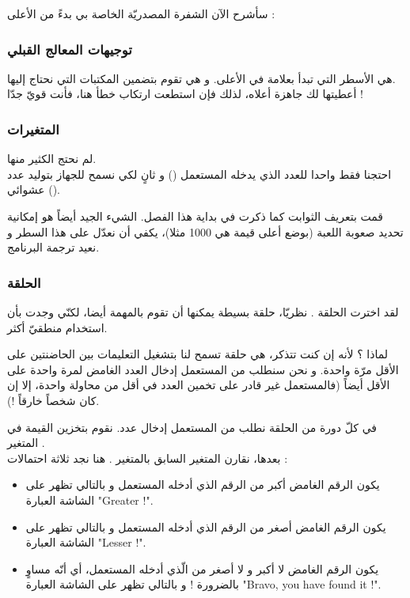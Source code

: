 سأشرح الآن الشفرة المصدريّة الخاصة بي بدءً من الأعلى :

\subsubsection{توجيهات المعالج القبلي}

هي الأسطر التي تبدأ بعلامة 
\InlineCode{\#}
في الأعلى. و هي تقوم بتضمين المكتبات التي نحتاج إليها.\\
أعطيتها لك جاهزة أعلاه، لذلك فإن استطعت ارتكاب خطأ هنا، فأنت قويّ جدّا !

\subsubsection{المتغيرات}

لم نحتج الكثير منها.\\
احتجنا فقط واحدا للعدد الذي يدخله المستعمل
() 
و ثانٍ لكي نسمح للجهاز بتوليد عدد عشوائي 
().

قمت بتعريف الثوابت كما ذكرت في بداية هذا الفصل. الشيء الجيد أيضاً هو إمكانية تحديد صعوبة اللعبة (بوضع أعلى قيمة هي 1000 مثلا)، يكفي أن نعدّل على هذا السطر و نعيد ترجمة البرنامج.

\subsubsection{الحلقة}

لقد اخترت الحلقة 
.
نظريّا، حلقة 
بسيطة يمكنها أن تقوم بالمهمة أيضا، لكنّي وجدت بأن استخدام 
منطقيّ أكثر. 

لماذا ؟  لأنه إن كنت تتذكر، 
هي حلقة تسمح لنا بتشغيل التعليمات بين الحاضنتين على الأقل مرّة واحدة. و نحن سنطلب من المستعمل إدخال العدد الغامض لمرة واحدة على الأقل أيضاً (فالمستعمل غير قادر على تخمين العدد في أقل من محاولة واحدة، إلا إن كان شخصاً خارقاً !).

في كلّ دورة من الحلقة نطلب من المستعمل إدخال عدد. نقوم بتخزين القيمة في المتغير 
.\\
بعدها، نقارن المتغير السابق بالمتغير 
.
هنا نجد ثلاثة احتمالات :

\begin{itemize}
	\item يكون الرقم الغامض أكبر من الرقم الذي أدخله المستعمل و بالتالي تظهر على الشاشة العبارة
	"\textenglish{Greater !}".
	\item يكون الرقم الغامض أصغر من الرقم الذي أدخله المستعمل و بالتالي تظهر على الشاشة العبارة
	"\textenglish{Lesser !}".
	\item يكون الرقم الغامض لا أكبر و لا أصغر من الّذي أدخله المستعمل، أي أنّه مساوٍ بالضرورة ! و بالتالي تظهر على الشاشة العبارة
	"\textenglish{Bravo, you have found it !}".
\end{itemize}

